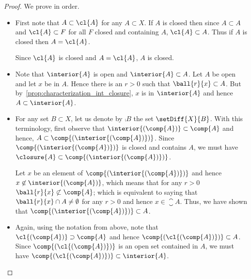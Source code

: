 \begin{proof}
    We prove in order.
    \begin{itemize}
	\item
	    First note that $A \subset \cl{A}$ for any $A \subset X$. If $A$ is closed then since $A \subset
	    A$ and $\cl{A} \subset F$ for all $F$ closed and containing $A$, $\cl{A} \subset A$. Thus if $A$
	    is closed then $A = \cl{A}$.

	    Since $\cl{A}$ is closed and $A = \cl{A}$, $A$ is closed.
	\item
	    Note that $\interior{A}$ is open and $\interior{A} \subset A$. Let $A$ be open and let $x$ be in
	    $A$. Hence there is an $r > 0$ such that $\ball{r}{x} \subset A$. But
	    by~\ref{prop:characterization_int_closure}, $x$ is in $\interior{A}$ and hence $A \subset
	    \interior{A}$.

	\item
	    For any set $B \subset X$, let us denote by $\comp{B}$ the set $\setDiff{X}{B}$. With this
	    terminology, first observe that $\interior{(\comp{A})} \subset \comp{A}$ and hence,
	    $A \subset \comp{(\interior{(\comp{A})})}$. Since $\comp{(\interior{(\comp{A})})}$ is closed and 
	    contains
	    $A$, we must have $\closure{A} \subset \comp{(\interior{(\comp{A})})}$.

	    Let $x$ be an element of $\comp{(\interior{(\comp{A})})}$ and hence 
	    $x \not\in \interior{(\comp{A})}$, which means that for any $r > 0$
	    $\ball{r}{x}\not\subset\comp{A}$; which is equivalent to saying that $\ball{r}{x}\cap A \neq
	    \emptyset$ for any $r > 0$ and hence $x \in \closure{A}$. Thus, we have shown that
	    $\comp{(\interior{(\comp{A})})} \subset A$.

	\item
	    Again, using the notation from above, note that $\cl{(\comp{A})} \supset \comp{A}$ and hence
	    $\comp{(\cl{(\comp{A})})} \subset A$. Since $\comp{(\cl{(\comp{A})})}$ is an open set contained in
	    $A$, we must have $\comp{(\cl{(\comp{A})})} \subset \interior{A}$.


\end{itemize}
\end{proof}
